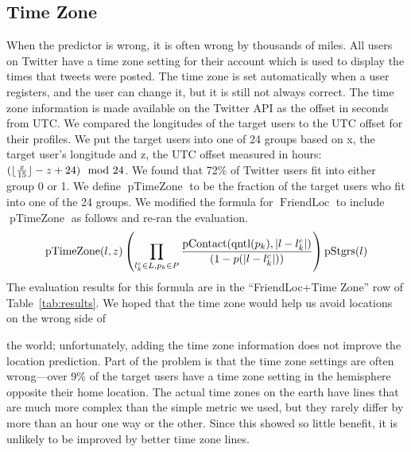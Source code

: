 \documentclass[letterpaper]{article}
\DeclareMathOperator{\pContact}{pContact}
\DeclareMathOperator{\pTimeZone}{pTimeZone}
\DeclareMathOperator{\pStrangers}{pStgrs}
\DeclareMathOperator{\FriendLoc}{FriendLoc}
\DeclareMathOperator{\quantile}{qntl}
\begin{document}
\ifdefined\THESIS
\subsection{Time Zone}
When the predictor is wrong, it is often wrong by thousands of miles.
%
All users on Twitter have a time zone setting for their account which is used
to display the times that tweets were posted.
%
The time zone is set automatically when a user registers, and the user can
change it, but it is still not always correct.
%
The time zone information is made available on the Twitter API as the offset
in seconds from UTC.
%
We compared the longitudes of the target users to the UTC offset for their
profiles.
%
We put the target users into one of 24 groups based on x, the target user's
longitude and z, the UTC offset measured in hours:
${(\lfloor {x\over15}\rfloor-z+24)\mod{24}}$.
%
We found that 72\% of Twitter users fit into either group 0 or 1.
%
We define $\pTimeZone$ to be the fraction of the target users who fit into one
of the 24 groups.
%
We modified the formula for $\FriendLoc$ to include $\pTimeZone$ as follows and
re-ran the evaluation.
\[
    \pTimeZone(l,z)
    \left(
        \prod_{l^c_k \in L,p_k \in P}
        {\pContact(\quantile(p_k),|l-l^c_k|) \over (1-p(|l-l^c_k|))}
    \right)
    \pStrangers(l)
\]
The evaluation results for this formula are in the ``FriendLoc+Time Zone'' row
of Table~\ref{tab:results}.
%
We hoped that the time zone would help us avoid locations on the wrong side of

the world; unfortunately, adding the time zone information does not improve the
location prediction.
%
Part of the problem is that the time zone settings are often wrong---over 9\% of
the target users have a time zone setting in the hemisphere opposite their home
location.
%
The actual time zones on the earth have lines that are much more complex than
the simple metric we used, but they rarely differ by more than an hour one way
or the other.
%
Since this showed so little benefit, it is unlikely to be improved by better
time zone lines.

\fi

\ifdefined\THESIS
\end{document}
